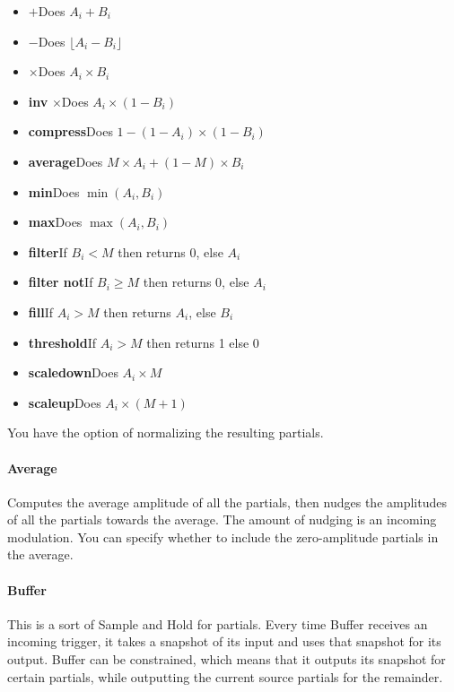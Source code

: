 \documentclass{article}
\begin{document}
\begin{itemize}
\item \(\boldsymbol{+}\)\quad Does \(A_i + B_i\)
\item \(\boldsymbol -\)\quad Does \(\lfloor A_i - B_i\rfloor\)
\item \(\boldsymbol \times\)\quad Does \(A_i \times B_i\)
\item {\bf inv} \(\boldsymbol \times\)\quad Does \(A_i \times (1 - B_i)\)
\item {\bf compress}\quad Does \(1 - (1 - A_i) \times (1 - B_i)\)
\item {\bf average}\quad Does \(M \times A_i + (1 - M) \times B_i\)
\item {\bf min}\quad Does \(\min(A_i, B_i)\)
\item {\bf max}\quad Does \(\max(A_i, B_i)\)
\item {\bf filter}\quad If \(B_i < M\) then returns 0, else \(A_i\)
\item {\bf filter not}\quad  If \(B_i \geq M\) then returns 0, else \(A_i\)
\item {\bf fill}\quad If \(A_i > M\) then returns \(A_i\), else \(B_i\)
\item {\bf threshold}\quad If \(A_i > M\) then returns 1 else 0
\item {\bf scaledown}\quad Does \(A_i \times M\)
\item {\bf scaleup}\quad Does \(A_i \times (M + 1)\)
\end{itemize}

You have the option of normalizing the resulting partials.

\paragraph{Average}  Computes the average amplitude of all the partials, then nudges the amplitudes of all the partials towards the average.  The amount of nudging is an incoming modulation.  You can specify whether to include the zero-amplitude partials in the average.

\paragraph{Buffer}  This is a sort of Sample and Hold for partials.  Every time Buffer receives an incoming trigger, it takes a snapshot of its input and uses that snapshot for its output.  Buffer can be constrained, which means that it outputs its snapshot for certain partials, while outputting the current source partials for the remainder.
\end{document}
